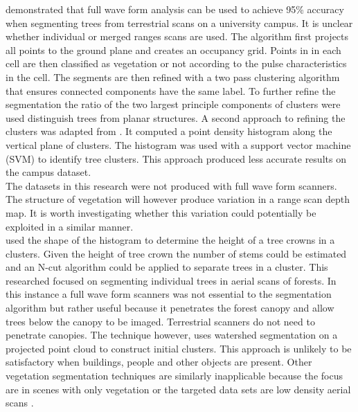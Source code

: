 \citet{Elseberg2011} demonstrated that full wave form analysis can be used to achieve 95\% accuracy when segmenting trees from terrestrial scans on a university campus. It is unclear whether individual or merged ranges scans are used. The algorithm first projects all points to the ground plane and creates an occupancy grid. Points in in each cell are then classified as vegetation or not according to the pulse characteristics in the cell. The segments are then refined with a two pass clustering algorithm that ensures connected components have the same label. To further refine the segmentation the ratio of the two largest principle components of clusters were used distinguish trees from planar structures. A second approach to refining the clusters was adapted from \citet{Reitberger2009}. It computed a point density histogram along the vertical plane of clusters. The histogram was used with a support vector machine (SVM) to identify tree clusters. This approach produced less accurate results on the campus dataset.\\

The datasets in this research were not produced with full wave form scanners. The structure of vegetation will however produce variation in a range scan depth map. It is worth investigating whether this variation could potentially be exploited in a similar manner.\\


\citet{Reitberger2009} used the shape of the histogram to determine the height of a tree crowns in a clusters. Given the height of tree crown the number of stems could be estimated and an N-cut algorithm could be applied to separate trees in a cluster. This researched focused on segmenting individual trees in aerial scans of forests. In this instance a full wave form scanners was not essential to the segmentation algorithm but rather useful because it penetrates the forest canopy and allow trees below the canopy to be imaged. Terrestrial scanners do not need to penetrate canopies. The technique however, uses watershed segmentation on a projected point cloud to construct initial clusters. This approach is unlikely to be satisfactory when buildings, people and other objects are present. Other vegetation segmentation techniques are similarly inapplicable because the focus are in scenes with only vegetation \cite{Haugerud2001} or the targeted data sets are low density aerial scans \cite{Charaniya2004}.\\

